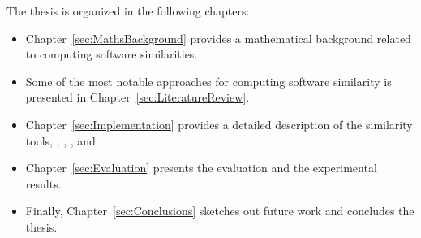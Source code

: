 The thesis is organized in the following chapters:

\begin{itemize}
	\item Chapter~\ref{sec:MathsBackground} provides a mathematical background related to computing software similarities.
	\item Some of the most notable approaches for computing software similarity is presented in Chapter~\ref{sec:LiteratureReview}.
	\item Chapter~\ref{sec:Implementation} provides a detailed description of the similarity tools, \ie \MUDABlue \cite{10.1109/APSEC.2004.69}, \CLAN \cite{McMillan:2012:DSS:2337223.2337267}, \RepoPal \cite{10.1109/SANER.2017.7884605}, and \CrossSim \cite{NDRDSEAA2018}.
	\item Chapter~\ref{sec:Evaluation} presents the evaluation and the experimental results.
	\item Finally, Chapter~\ref{sec:Conclusions} sketches out future work and concludes the thesis. 
\end{itemize}